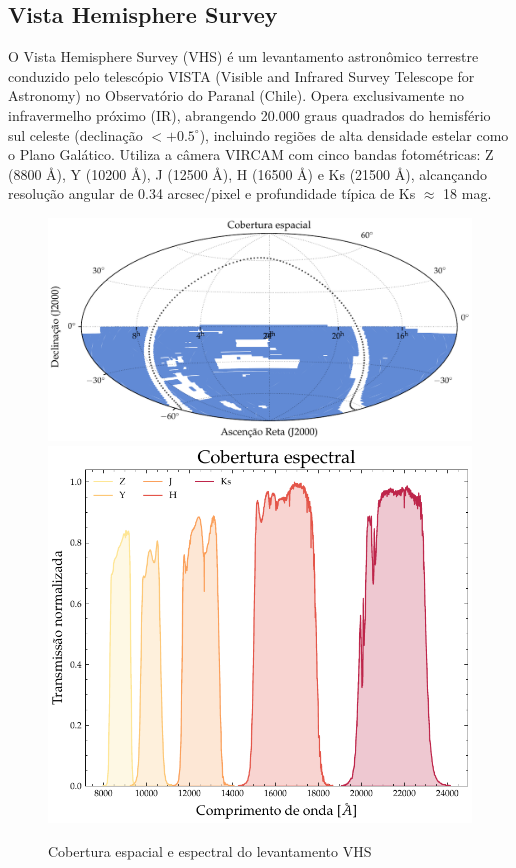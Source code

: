\subsection{Vista Hemisphere Survey}
\label{sec:vista}

O Vista Hemisphere Survey (VHS) é um levantamento astronômico terrestre conduzido pelo telescópio VISTA (Visible and Infrared Survey Telescope for Astronomy) no Observatório do Paranal (Chile). Opera exclusivamente no infravermelho próximo (IR), abrangendo 20.000 graus quadrados do hemisfério sul celeste (declinação $< +0.5^\circ$), incluindo regiões de alta densidade estelar como o Plano Galático. Utiliza a câmera VIRCAM com cinco bandas fotométricas: Z (8800 \AA), Y (10200 \AA), J (12500 \AA), H (16500 \AA) e Ks (21500 \AA), alcançando resolução angular de 0.34 arcsec/pixel e profundidade típica de Ks $\approx$ 18 mag.

\begin{figure}[!ht]
  \centering
  \caption{Cobertura espacial e espectral do levantamento VHS}
  \label{fig:footprint-vhs}
  \includegraphics[width=0.61\linewidth]{figures/footprint_vista.pdf}\hfill
  \includegraphics[width=0.37\linewidth]{figures/transmission_vista.pdf}
\end{figure}







